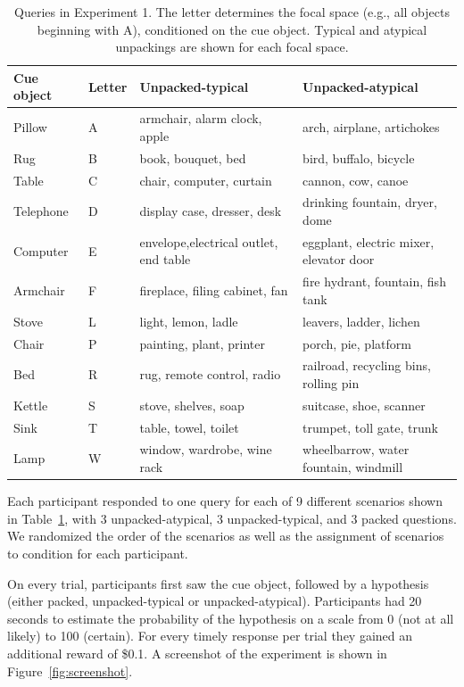 \begin{table}[htbp]
\caption{Queries in Experiment 1. The letter determines the focal space (e.g., all objects beginning with A), conditioned on the cue object. Typical and atypical unpackings are shown for each focal space.}
\label{tab:scenarios}

  \begin{center} 
\begin{tabular}{m{}  p{} >{\raggedright}p{} >{\raggedright}p{}}
  \toprule
\bf{Cue object} & \bf{Letter} & \bf{Unpacked-typical} & \bf{Unpacked-atypical}\tabularnewline
\midrule
Pillow & A & armchair, alarm clock, apple & arch, airplane, artichokes\tabularnewline
Rug & B & book, bouquet, bed & bird, buffalo, bicycle\tabularnewline
Table & C & chair, computer, curtain & cannon, cow, canoe\tabularnewline
Telephone & D & display case, dresser, desk & drinking fountain, dryer, dome\tabularnewline
Computer & E & envelope,electrical outlet, end table & eggplant, electric mixer, elevator door\tabularnewline
Armchair & F & fireplace, filing cabinet, fan& fire hydrant, fountain, fish tank\tabularnewline
Stove & L & light, lemon, ladle& leavers, ladder, lichen\tabularnewline
Chair & P & painting, plant, printer& porch, pie, platform\tabularnewline
Bed & R & rug, remote control, radio & railroad, recycling bins, rolling pin\tabularnewline
Kettle & S & stove, shelves, soap& suitcase, shoe, scanner\tabularnewline
Sink & T & table, towel, toilet & trumpet, toll gate, trunk\tabularnewline
Lamp & W & window, wardrobe, wine rack & wheelbarrow, water fountain, windmill\tabularnewline
\bottomrule

\end{tabular}
\end{center}
\end{table}



Each participant responded to one query for each of 9 different scenarios shown in Table~\ref{tab:scenarios}, with 3 unpacked-atypical, 3 unpacked-typical, and 3 packed questions. We randomized the order of the scenarios as well as the assignment of scenarios to condition for each participant.

On every trial, participants first saw the cue object, followed by a hypothesis (either packed, unpacked-typical or unpacked-atypical). Participants had 20 seconds to estimate the probability of the hypothesis on a scale from 0 (not at all likely) to 100 (certain). For every timely response per trial they gained an additional reward of \$0.1. A screenshot of the experiment is shown in Figure~\ref{fig:screenshot}.

